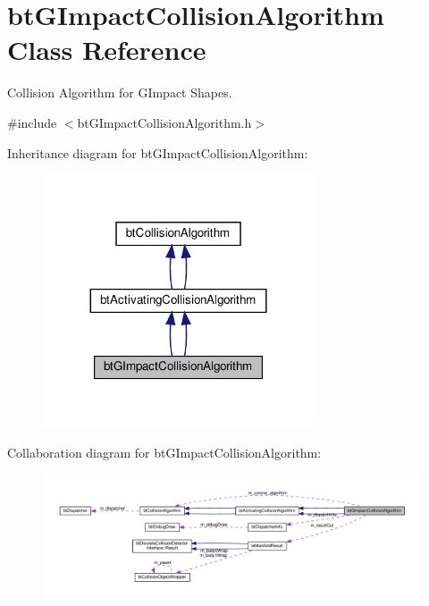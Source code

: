 \hypertarget{classbtGImpactCollisionAlgorithm}{}\section{bt\+G\+Impact\+Collision\+Algorithm Class Reference}
\label{classbtGImpactCollisionAlgorithm}


Collision Algorithm for G\+Impact Shapes.  




{\ttfamily \#include $<$bt\+G\+Impact\+Collision\+Algorithm.\+h$>$}



Inheritance diagram for bt\+G\+Impact\+Collision\+Algorithm\+:
\nopagebreak
\begin{figure}[H]
\begin{center}
\leavevmode
\includegraphics[width=227pt]{classbtGImpactCollisionAlgorithm__inherit__graph}
\end{center}
\end{figure}


Collaboration diagram for bt\+G\+Impact\+Collision\+Algorithm\+:
\nopagebreak
\begin{figure}[H]
\begin{center}
\leavevmode
\includegraphics[width=350pt]{classbtGImpactCollisionAlgorithm__coll__graph}
\end{center}
\end{figure}
